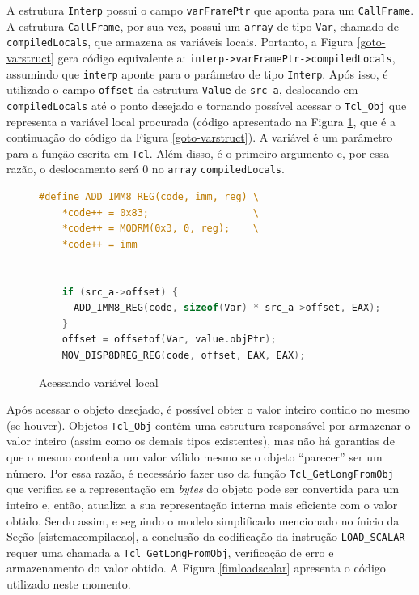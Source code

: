 

A estrutura \verb!Interp! possui o campo \verb!varFramePtr! que
aponta para um \verb!CallFrame!. %
A estrutura \verb!CallFrame!, por sua vez, possui um
\verb!array! de tipo \verb!Var!, chamado de \verb!compiledLocals!,
que armazena as variáveis locais. Portanto, a Figura
\ref{goto-varstruct} gera código equivalente a:
\verb!interp->varFramePtr->compiledLocals!, assumindo
que \verb!interp! aponte para o parâmetro de tipo
\verb!Interp!. Após isso, é utilizado o campo
\verb!offset! da estrutura \verb!Value! de \verb!src_a!, deslocando em
\verb!compiledLocals! até o ponto desejado e tornando possível acessar
o \verb!Tcl_Obj! que representa a variável local procurada (código
apresentado na Figura \ref{goto-localvar}, que é a continuação do
código da Figura \ref{goto-varstruct}). A
variável é um parâmetro para a função
escrita em \texttt{Tcl}. Além disso, é o primeiro argumento e, por
essa razão, o deslocamento será 0 no \verb!array! \verb!compiledLocals!.

\begin{figure}[h]
  \centering
  \begin{lstlisting}[language=C]
#define ADD_IMM8_REG(code, imm, reg) \
    *code++ = 0x83;                  \
    *code++ = MODRM(0x3, 0, reg);    \
    *code++ = imm


    if (src_a->offset) {
      ADD_IMM8_REG(code, sizeof(Var) * src_a->offset, EAX);
    }
    offset = offsetof(Var, value.objPtr);
    MOV_DISP8DREG_REG(code, offset, EAX, EAX);
  \end{lstlisting}
  \caption{Acessando variável local\label{goto-localvar}}
\end{figure}

Após acessar o objeto desejado, é possível obter o valor inteiro
contido no mesmo (se houver). Objetos \verb!Tcl_Obj! contém uma
estrutura responsável por armazenar o valor inteiro (assim como os
demais tipos existentes), mas não há
garantias de que o mesmo contenha um valor válido mesmo se o objeto
``parecer'' ser um número. Por essa razão, é necessário fazer uso da
função \verb!Tcl_GetLongFromObj! que verifica se a representação em
\textit{bytes} do objeto pode ser convertida para um inteiro e, então,
atualiza a sua representação interna mais eficiente com o valor
obtido. Sendo assim, e seguindo o modelo simplificado mencionado no
ínicio da Seção \ref{sistemacompilacao}, a conclusão da codificação da
instrução \verb!LOAD_SCALAR! requer uma chamada a
\verb!Tcl_GetLongFromObj!, verificação de erro e armazenamento do
valor obtido. A Figura \ref{fimloadscalar} apresenta o código
utilizado neste momento.

